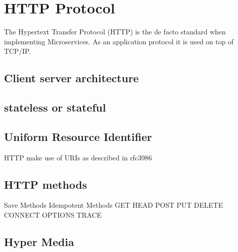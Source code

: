 \section{HTTP Protocol}
\label{sec:http_protocol}
The Hypertext Transfer Protocol (HTTP) is the de facto standard when implementing Microservices. As an application protocol it is used on top of TCP/IP.  
\subsection{Client server architecture}
\subsection{stateless or stateful}
\subsection{Uniform Resource Identifier}
HTTP make use of URIs as described in rfc3986
\subsection{HTTP methods}
Save Methods 
Idempotent Methods
GET
HEAD
POST
PUT
DELETE
CONNECT
OPTIONS
TRACE
\subsection{Hyper Media}